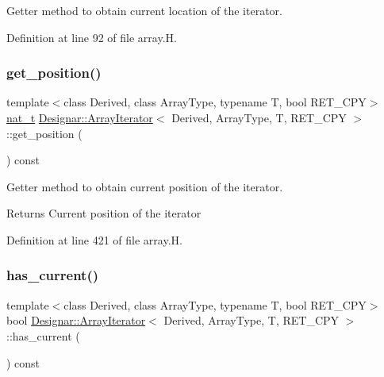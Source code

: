 Getter method to obtain current location of the iterator. 



Definition at line 92 of file array.\+H.

\mbox{\label{class_designar_1_1_array_iterator_a209ca14a9628f0a67a258469d98089b8}} 
\subsubsection{\texorpdfstring{get\+\_\+position()}{get\_position()}}
{\footnotesize\ttfamily template$<$class Derived, class Array\+Type, typename T, bool R\+E\+T\+\_\+\+C\+PY$>$ \\
\hyperlink{namespace_designar_aa72662848b9f4815e7bf31a7cf3e33d1}{nat\+\_\+t} \hyperlink{class_designar_1_1_array_iterator}{Designar\+::\+Array\+Iterator}$<$ Derived, Array\+Type, T, R\+E\+T\+\_\+\+C\+PY $>$\+::get\+\_\+position (\begin{DoxyParamCaption}{ }\end{DoxyParamCaption}) const\hspace{0.3cm}{\ttfamily [inline]}}



Getter method to obtain current position of the iterator. 

\begin{DoxyReturn}{Returns}
Current position of the iterator 
\end{DoxyReturn}


Definition at line 421 of file array.\+H.

\mbox{\label{class_designar_1_1_array_iterator_aafec192c97299c4f21c28c65e58b19fc}} 
\subsubsection{\texorpdfstring{has\+\_\+current()}{has\_current()}}
{\footnotesize\ttfamily template$<$class Derived, class Array\+Type, typename T, bool R\+E\+T\+\_\+\+C\+PY$>$ \\
bool \hyperlink{class_designar_1_1_array_iterator}{Designar\+::\+Array\+Iterator}$<$ Derived, Array\+Type, T, R\+E\+T\+\_\+\+C\+PY $>$\+::has\+\_\+current (\begin{DoxyParamCaption}{ }\end{DoxyParamCaption}) const\hspace{0.3cm}{\ttfamily [inline]}}



